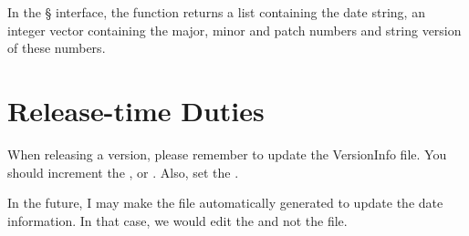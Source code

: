 \documentclass{article}
\begin{document}
In the \S{} interface, the function 
returns a list containing the date string, an integer vector
containing the major, minor and patch numbers
and string version of these numbers.


\section{Release-time Duties}

When releasing a version, please remember to update the VersionInfo
file.  You should increment the ,
 or .  Also, set the
.

In the future, I may make the  file automatically
generated to update the date information.  In that case, we would edit
the  and not the  file.
\end{document}
